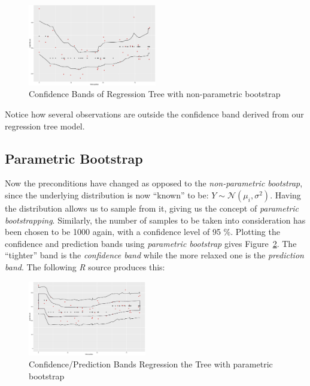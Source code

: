 \documentclass[a4paper, twocolumn]{article}
\begin{document}
        

        \begin{figure}[h!]
            \centering
            \caption{Confidence Bands of Regression Tree with non-parametric bootstrap}
            \label{fig:confidence_bands}
            \includegraphics[width=0.5\textwidth]{share/A1_nonparametric.eps}
        \end{figure}

        Notice how several observations are outside the confidence band derived from our regression tree model.

    \subsection*{Parametric Bootstrap}

        Now the preconditions have changed as opposed to the \emph{non-parametric bootstrap}, since the underlying distribution is now ``known'' to be: $Y \sim \mathcal{N}(\mu_i, \sigma^2)$. Having the distribution allows us to sample from it, giving us the concept of \emph{parametric bootstrapping}. Similarly, the number of samples to be taken into consideration has been chosen to be 1000 again, with a confidence level of 95 \%. Plotting the confidence and prediction bands using \emph{parametric bootstrap} gives Figure~\ref{fig:confpred_bands}. The ``tighter'' band is the \emph{confidence band} while the more relaxed one is the \emph{prediction band}. The following \emph{R} source produces this:

        

        \begin{figure}[h!]
            \centering
            \caption{Confidence/Prediction Bands Regression the Tree with parametric bootstrap}
            \label{fig:confpred_bands}
            \includegraphics[width=0.46\textwidth]{share/A1_parametric.eps}
        \end{figure}
\end{document}
